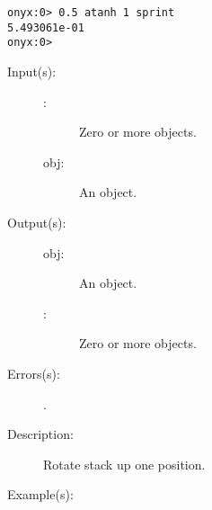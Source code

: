 \begin{description}
\begin{description}
\begin{verbatim}
onyx:0> 0.5 atanh 1 sprint
5.493061e-01
onyx:0>
		\end{verbatim}
	\end{description}
\label{systemdict:aup}
\item[{\onyxop{\commas obj}{aup}{obj \commas}}: ]
	\begin{description}\item[]
	\item[Input(s): ]
		\begin{description}\item[]
		\item[\commas: ]
			Zero or more objects.
		\item[obj: ]
			An object.
		\end{description}
	\item[Output(s): ]
		\begin{description}\item[]
		\item[obj: ]
			An object.
		\item[\commas: ]
			Zero or more objects.
		\end{description}
	\item[Errors(s): ]
		\begin{description}\item[]
		\item[.]
		\end{description}
	\item[Description: ]
		Rotate stack up one position.
	\item[Example(s): ]\begin{verbatim}


\end{verbatim}
\end{description}
\end{description}
